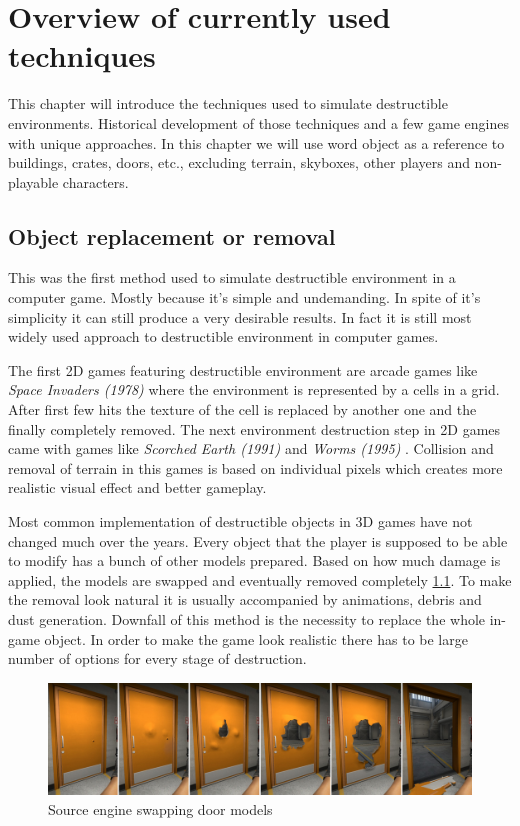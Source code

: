 \chapter{Overview of currently used techniques}
This chapter will introduce the techniques used to simulate destructible environments. Historical development of those techniques and a few game engines with unique approaches. In this chapter we will use word object as a reference to buildings, crates, doors, etc., excluding terrain, skyboxes, other players and non-playable characters.

\section{Object replacement or removal}
This was the first method used to simulate destructible environment in a computer game. Mostly because it's simple and undemanding. In spite of it's simplicity it can still produce a very desirable results. In fact it is still most widely used approach to destructible environment in computer games.

The first 2D games featuring destructible environment are arcade games like \emph{Space Invaders (1978)} \cite{invaders} where the environment is represented by a cells in a grid. After first few hits the texture of the cell is replaced by another one and the finally completely removed. The next environment destruction step in 2D games came with games like \emph{Scorched Earth (1991)} \cite{scorched} and \emph{Worms (1995)} \cite{worms}. Collision and removal of terrain in this games is based on individual pixels which creates more realistic visual effect and better gameplay.

Most common implementation of destructible objects in 3D games have not changed much over the years. Every object that the player is supposed to be able to modify has a bunch of other models prepared. Based on how much damage is applied, the models are swapped and eventually removed completely \ref{doors}. To make the removal look natural it is usually accompanied by animations, debris and dust generation. Downfall of this method is the necessity to replace the whole in-game object. In order to make the game look realistic there has to be large number of options for every stage of destruction.

\begin{figure}[!h]
\label{doors}
\includegraphics[width=\textwidth]{img/doors}
\caption{Source engine swapping door models}
\end{figure}

